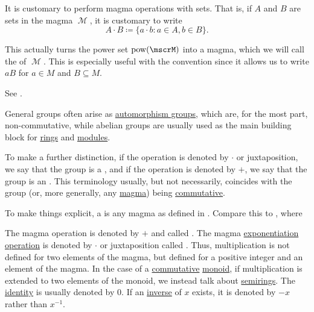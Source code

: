 \begin{definition}
\begin{thmenum}
     It is customary to perform magma operations with sets. That is, if \( A \) and \( B \) are sets in the magma \( \mscrM \), it is customary to write
    \begin{equation*}
      A \cdot B \coloneqq \{ a \cdot b \colon a \in A, b \in B \}.
    \end{equation*}

    This actually turns the power set \( \pow(\mscrM) \) into a magma, which we will call the  of \( \mscrM \). This is especially useful with the convention  since it allows us to write \( aB \) for \( a \in M \) and \( B \subseteq M \).

    See .
  \end{thmenum}
\end{definition}

\begin{remark}\label{rem:additive_magma}
  General groups often arise as \hyperref[def:automorphism_group]{automorphism groups}, which are, for the most part, non-commutative, while abelian groups are usually used as the main building block for \hyperref[def:semiring/ring]{rings} and \hyperref[def:left_module]{modules}.

  To make a further distinction, if the operation is denoted by \( \cdot \) or juxtaposition, we say that the group is a , and if the operation is denoted by \( + \), we say that the group is an . This terminology usually, but not necessarily, coincides with the group (or, more generally, any \hyperref[def:magma]{magma}) being \hyperref[def:magma/commutative]{commutative}.

  To make things explicit, a  is any magma as defined in . Compare this to , where
  \begin{thmenum}
     The magma operation is denoted by \( + \) and called .
     The magma \hyperref[def:magma/exponentiation]{exponentiation operation} is denoted by \( \cdot \) or juxtaposition called . Thus, multiplication is not defined for two elements of the magma, but defined for a positive integer and an element of the magma. In the case of a \hyperref[def:magma/commutative]{commutative} \hyperref[def:unital_magma/associative]{monoid}, if multiplication is extended to two elements of the monoid, we instead talk about \hyperref[def:semiring]{semirings}.
     The \hyperref[def:magma_identity]{identity} is usually denoted by \( 0 \).
     If an \hyperref[def:unital_magma_inverse_element]{inverse} of \( x \) exists, it is denoted by \( -x \) rather than \( x^{-1} \).
  \end{thmenum}
\end{remark}

